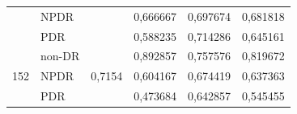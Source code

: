 \begin{table}[h!]
\begin{center}
\begin{tabular}{clclll}
                                  & NPDR                      &                         & 0,666667                 & 0,697674                & 0,681818               \\
                                  & PDR                       &                         & 0,588235                 & 0,714286                & 0,645161               \\ \cline{1-6}
            \multirow{3}{*}{152}  & non-DR                    & \multirow{3}{*}{0,7154} & 0,892857                 & 0,757576                & 0,819672               \\
                                  & NPDR                      &                         & 0,604167                 & 0,674419                & 0,637363               \\
                                  & PDR                       &                         & 0,473684                 & 0,642857                & 0,545455               \\ \cline{1-6}
            \end{tabular}
        \end{center}
    \end{table}